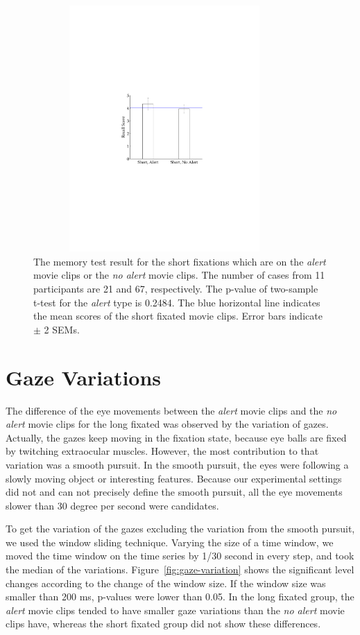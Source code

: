 \documentclass[oneside,master]{snueethesis}
\begin{document}
\begin{figure}
  \centerline{\includegraphics[width=100mm,height=94mm,trim=54mm 90mm 54mm 90mm]{./eps/memtest_short.pdf}}
  \caption[The memory test result for the short fixations which are on the alert movie clips or no alert movie clips]{The memory test result for the short fixations which are on the \textit{alert} movie clips or the \textit{no alert} movie clips. The number of cases from 11 participants are 21 and 67, respectively. The p-value of two-sample t-test for the \textit{alert} type is 0.2484. The blue horizontal line indicates the mean scores of the short fixated movie clips. Error bars indicate $\pm$ 2 SEMs.}
  \label{fig:memtest-short}
\end{figure}


\section{Gaze Variations}
\label{subsec:gaze-variations}

The difference of the eye movements between the \textit{alert} movie clips and the \textit{no alert} movie clips for the long fixated was observed by the variation of gazes. Actually, the gazes keep moving in the fixation state, because eye balls are fixed by twitching extraocular muscles. However, the most contribution to that variation was a smooth pursuit. In the smooth pursuit, the eyes were following a slowly moving object or interesting features. Because our experimental settings did not and can not precisely define the smooth pursuit, all the eye movements slower than 30 degree per second were candidates. 

To get the variation of the gazes excluding the variation from the smooth pursuit, we used the window sliding technique. Varying the size of a time window, we moved the time window on the time series by 1/30 second in every step, and took the median of the variations. Figure~\ref{fig:gaze-variation} shows the significant level changes according to the change of the window size. If the window size was smaller than 200 ms, p-values were lower than 0.05. In the long fixated group, the \textit{alert} movie clips tended to have smaller gaze variations than the \textit{no alert} movie clips have, whereas the short fixated group did not show these differences.
\end{document}
